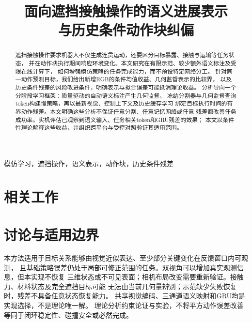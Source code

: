 \documentclass[journal,10pt]{IEEEtran}
\title{面向遮挡接触操作的语义进展表示\\与历史条件动作块纠偏}
\author{}
\begin{document}
\maketitle
\begin{abstract}
遮挡接触操作要求机器人不仅生成连贯运动，还要区分目标暴露、接触与运输等任务状态，
并在动作块执行期间响应环境变化。本文研究在有限示范、较少额外语义标注及受限在线计算下，
如何增强模仿策略的任务完成能力，而不预设特定网络分工。
针对同一动作预测目标，我们给出新增RGB的条件均值收益、几何监督表示的比较界，
以及历史条件残差的风险改进条件，明确表示与拟合误差可能抵消理论收益。
分析导向一个分阶段学习框架：质量驱动的自动语义标注产生几何监督，
冻结分割器与几何监督查询token构建慢策略，再以最新视觉、控制上下文及历史缓存学习
绑定目标执行时间的有界动作残差。本文明确这些分析不保证任意分割、任意记忆网络或任意
残差都改善任务成功率。实机评估已观察到语义输入、任务相关token和GRU残差的效果；
本文以条件性理论解释这些收益，并组织跨平台与受控对照验证其适用范围。
\end{abstract}
\begin{IEEEkeywords}
模仿学习，遮挡操作，语义表示，动作块，历史条件残差
\end{IEEEkeywords}

\section{相关工作}



\section{讨论与适用边界}
本方法适用于目标关系能够由视觉近似表达、至少部分关键变化在反馈窗口内可观测，
且基础策略误差仍处于局部可修正范围的任务。双视角可以增加真实观测信息，但本实现不恢复
三维状态或不可见表面；相机布局改变需要重新验证。接触力、材料状态及完全遮挡目标可能
无法由当前几何量辨别；示范缺少失败恢复时，残差不具备任意状态恢复能力。
共享视觉编码、三通道语义映射和GRU均是实现选择，不是理论唯一解。
理论分析约束论证与实验，不将平方动作误差改善等同于闭环稳定性、碰撞安全或必然完成。
\appendices



\end{document}
